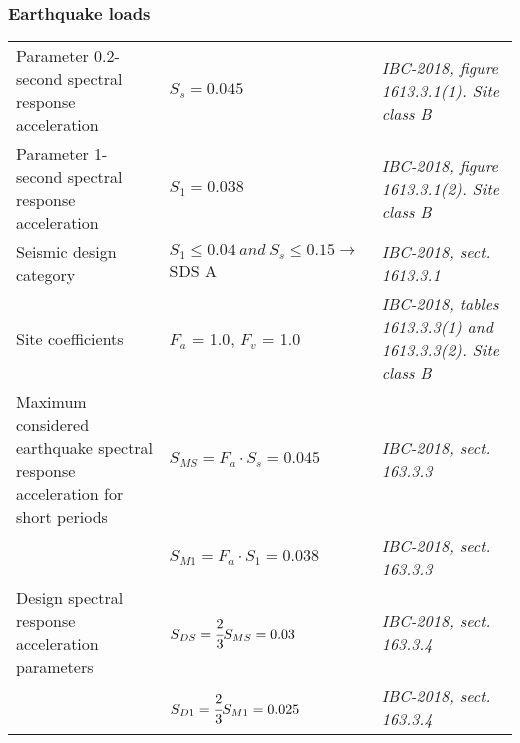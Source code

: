 \subsubsection{Earthquake loads}
\begin{tabular}{p{4cm}l|p{4cm}}
Parameter 0.2-second spectral response acceleration & $S_s = 0.045$ &  \emph{IBC-2018, figure 1613.3.1(1). Site class B} \\
Parameter 1-second spectral response acceleration & $S_1 = 0.038$ &  \emph{IBC-2018, figure 1613.3.1(2). Site class B} \\
Seismic design category & $S_1 \le 0.04\ and\  S_s \le 0.15 \rightarrow $ SDS A & \emph{IBC-2018, sect. 1613.3.1} \\
Site coefficients & $F_a$ = 1.0, $F_v$ = 1.0 & \emph{IBC-2018, tables 1613.3.3(1) and 1613.3.3(2). Site class  B} \\
Maximum considered earthquake spectral response acceleration for short periods & $S_{MS} = F_a\cdot S_s = 0.045$ &  \emph{IBC-2018, sect. 163.3.3} \\
& $S_{M1} = F_a\cdot S_1 = 0.038$ &  \emph{IBC-2018, sect. 163.3.3} \\
Design spectral response acceleration parameters & $S_{DS} = \cfrac{2}{3} S_{MS} = 0.03$ & \emph{IBC-2018, sect. 163.3.4} \\
& $S_{D1} = \cfrac{2}{3} S_{M1} = 0.025$ & \emph{IBC-2018, sect. 163.3.4} \\
\end{tabular}


